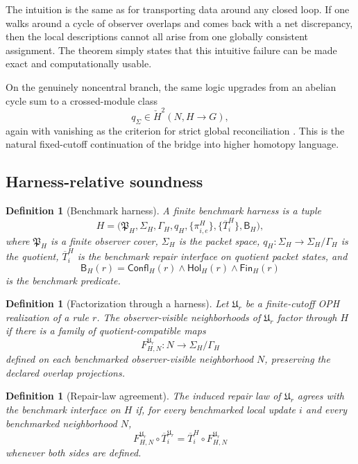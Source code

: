 \documentclass[11pt]{article}
\newtheorem{definition}[theorem]{Definition}
\theoremstyle{remark}
\theoremstyle{plain}
\begin{document}
The intuition is the same as for transporting data around any closed loop. If one walks around a cycle of observer overlaps and comes back with a net discrepancy, then the local descriptions cannot all arise from one globally consistent assignment. The theorem simply states that this intuitive failure can be made exact and computationally usable.

On the genuinely noncentral branch, the same logic upgrades from an abelian cycle sum to a crossed-module class
\[
q_\Sigma\in \check H^2(N,H\to G),
\]
again with vanishing as the criterion for strict global reconciliation \cite{ophconsensus}. This is the natural fixed-cutoff continuation of the bridge into higher homotopy language.

\subsection{Harness-relative soundness}

\begin{definition}[Benchmark harness]
A finite benchmark harness is a tuple
\[
H=
\bigl(
\mathfrak P_H,\Sigma_H,\Gamma_H,q_H,
\{\pi^H_{i,e}\},
\{\overline T^H_i\},
\mathsf B_H
\bigr),
\]
where \(\mathfrak P_H\) is a finite observer cover, \(\Sigma_H\) is the packet space, \(q_H:\Sigma_H\to\Sigma_H/\Gamma_H\) is the quotient, \(\overline T_i^H\) is the benchmark repair interface on quotient packet states, and
\[
\mathsf B_H(r)=
\mathsf{Confl}_H(r)\wedge \mathsf{Hol}_H(r)\wedge \mathsf{Fin}_H(r)
\]
is the benchmark predicate.
\end{definition}

\begin{definition}[Factorization through a harness]
Let \(\mathfrak U_r\) be a finite-cutoff OPH realization of a rule \(r\). The observer-visible neighborhoods of \(\mathfrak U_r\) factor through \(H\) if there is a family of quotient-compatible maps
\[
F^{\mathfrak U_r}_{H,N}:N\to \Sigma_H/\Gamma_H
\]
defined on each benchmarked observer-visible neighborhood \(N\), preserving the declared overlap projections.
\end{definition}

\begin{definition}[Repair-law agreement]
The induced repair law of \(\mathfrak U_r\) agrees with the benchmark interface on \(H\) if, for every benchmarked local update \(i\) and every benchmarked neighborhood \(N\),
\[
F^{\mathfrak U_r}_{H,N}\circ \overline T_i^{\mathfrak U_r}
=
\overline T_i^H\circ F^{\mathfrak U_r}_{H,N}
\]
whenever both sides are defined.
\end{definition}
\end{document}
